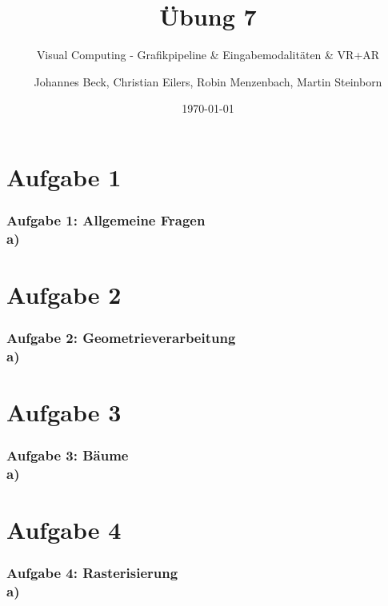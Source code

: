 \documentclass[accentcolor=tud9c,colorbacktitle,inverttitle,landscape,german,presentation,t]{tudbeamer}
\begin{document}
\title{\"Ubung 7}
\subtitle{Visual Computing - Grafikpipeline \& Eingabemodalit\"aten \& VR+AR} %

\author[Johannes Beck, Christian Eilers, Robin Menzenbach, Martin Steinborn]{Johannes Beck, Christian Eilers, Robin Menzenbach, Martin Steinborn}


\date{\today}

\begin{titleframe}
\end{titleframe}

\section{Aufgabe 1}
	\begin{frame}
		\frametitle{Aufgabe 1: Allgemeine Fragen \\ a)} %
	\end{frame}

\section{Aufgabe 2}
	\begin{frame}
		\frametitle{Aufgabe 2: Geometrieverarbeitung \\ a)} %
	\end{frame}
	
\section{Aufgabe 3}
	\begin{frame}
		\frametitle{Aufgabe 3: B\"aume \\ a)} %
	\end{frame}
	
\section{Aufgabe 4}
	\begin{frame}
		\frametitle{Aufgabe 4: Rasterisierung \\ a)} %
	\end{frame}
\end{document}
